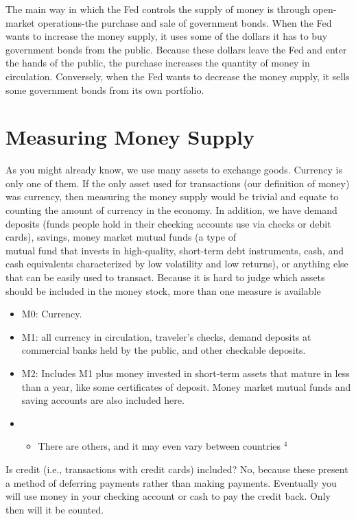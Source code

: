\documentclass[10pt]{article}
\begin{document}
The main way in which the Fed controls the supply of money is through open-market operations-the purchase and sale of government bonds. When the Fed wants to increase the money supply, it uses some of the dollars it has to buy government bonds from the public. Because these dollars leave the Fed and enter the hands of the public, the purchase increases the quantity of money in circulation. Conversely, when the Fed wants to decrease the money supply, it sells some government bonds from its own portfolio.

\section*{Measuring Money Supply}
As you might already know, we use many assets to exchange goods. Currency is only one of them. If the only asset used for transactions (our definition of money) was currency, then measuring the money supply would be trivial and equate to counting the amount of currency in the economy. In addition, we have demand deposits (funds people hold in their checking accounts use via checks or debit cards), savings, money market mutual funds (a type of\\
mutual fund that invests in high-quality, short-term debt instruments, cash, and cash equivalents characterized by low volatility and low returns), or anything else that can be easily used to transact. Because it is hard to judge which assets should be included in the money stock, more than one measure is available

\begin{itemize}
  \item M0: Currency.
  \item M1: all currency in circulation, traveler's checks, demand deposits at commercial banks held by the public, and other checkable deposits.
  \item M2: Includes M1 plus money invested in short-term assets that mature in less than a year, like some certificates of deposit. Money market mutual funds and saving accounts are also included here.
  \item 
  \begin{itemize}
    \item There are others, and it may even vary between countries ${ }^{4}$
  \end{itemize}
\end{itemize}

Is credit (i.e., transactions with credit cards) included? No, because these present a method of deferring payments rather than making payments. Eventually you will use money in your checking account or cash to pay the credit back. Only then will it be counted.
\end{document}
